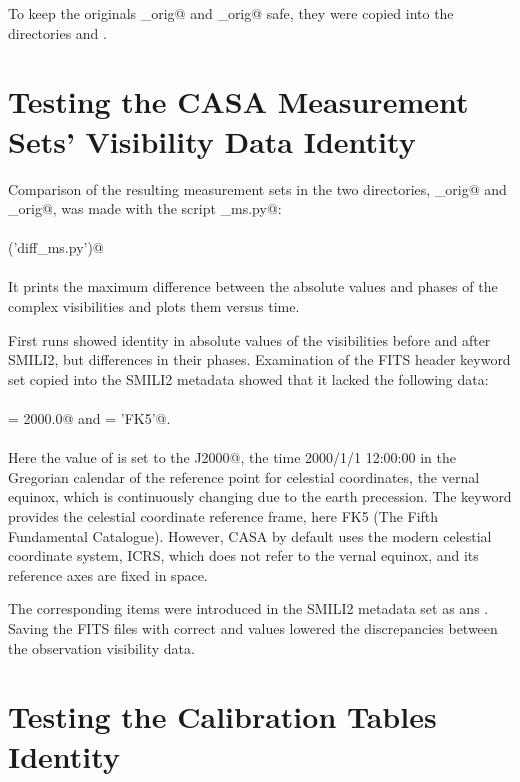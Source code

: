 \documentclass[preprint]{aastex}
\begin{document}
To keep the originals \verb@alma_orig@ and \verb@smili_orig@ safe, they were copied into the directories \verb@alma@ and \verb@smili@.



\section{Testing the CASA Measurement Sets' Visibility Data Identity}

Comparison of the resulting measurement sets in the two directories, \verb@alma_orig@ and \verb@smili_orig@, was made with the script \verb@diff_ms.py@: \\
\\
\verb@execfile('diff_ms.py')@ \\
\\
It prints the maximum difference between the absolute values and phases of the complex visibilities and plots them versus time. 

First runs showed identity in absolute values of the visibilities before and after SMILI2, but differences in their phases. Examination of the FITS header keyword set copied into the SMILI2 metadata showed that it lacked the following data: \\
\\
\verb@EQUINOX = 2000.0@ and \verb@RADESYS = 'FK5'@. \\
\\
Here the value of \verb@EQUINOX@ is set to the \verb@epoch J2000@, the time 2000/1/1 12:00:00 in the Gregorian calendar of the reference point for celestial coordinates, the vernal equinox, which is continuously changing due to the earth precession. The keyword \verb@RADESYS@ provides the celestial coordinate reference frame, here FK5 (The Fifth Fundamental Catalogue). However, CASA by default uses the modern celestial coordinate system, ICRS, which does not refer to the vernal equinox, and its reference axes are fixed in space.  

The corresponding items were introduced in the SMILI2 metadata set as \verb@equinox@ ans \verb@coordsys@. Saving the FITS files with correct \verb@EQUINOX@ and \verb@RADESYS@ values lowered the discrepancies between the observation visibility data.



\section{Testing the Calibration Tables Identity}
\end{document}
